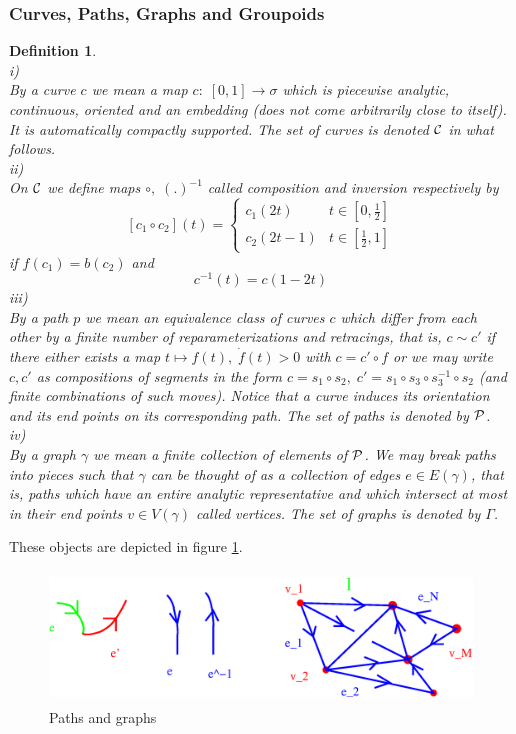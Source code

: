 \documentclass[12pt]{report}
\newtheorem{Definition}{Definition}[section]
\def\be{\begin{equation}}
\def\ee{\end{equation}}
\begin{document}
\subsubsection{Curves, Paths, Graphs and Groupoids}
\label{s.2.1.2.1}

%
\begin{Definition} \label{def2.1.2.1} ~~~~~\\
i)\\
By a curve $c$ we mean a map $c:\;[0,1]\to \sigma$ which is piecewise 
analytic, continuous,
oriented and an embedding (does not come arbitrarily close to itself).
It is automatically compactly supported.
The set of curves is denoted $\cal C$ in what follows.\\
ii)\\
On $\cal C$ we define maps $\circ,\;(.)^{-1}$ called composition and 
inversion respectively by 
\be \label{2.1.2.1}
[c_1\circ c_2](t)= \left\{ \begin{array}{cc}
c_1(2t) &  t\in [0,\frac{1}{2}] \\
c_2(2t-1) &  t\in [\frac{1}{2},1] 
\end{array} \right.
\ee
if $f(c_1)=b(c_2)$ and 
\be \label{2.1.2.2}
c^{-1}(t)=c(1-2t)
\ee
iii)\\
By a path $p$ we mean an equivalence class of curves $c$ which differ
from each other by a finite number of reparameterizations and retracings, 
that is, $c\sim c'$ if there either exists a map   
$t\mapsto f(t),\;\dot{f}(t)>0$ with $c=c'\circ f$ or we may write 
$c,c'$ as compositions of segments in the form $c=s_1\circ s_2,\; 
c'=s_1\circ s_3\circ s_3^{-1}\circ s_2$ (and finite combinations of 
such moves). Notice that a curve induces its orientation and its end 
points on its 
corresponding path. The set of paths is denoted by $\cal P$. \\
iv)\\
By a graph $\gamma$ we mean a finite collection of elements of $\cal P$.
We may break paths into pieces such that $\gamma$ can be thought of
as a collection of edges $e\in E(\gamma)$, that is, paths which have an 
entire analytic
representative and which intersect at most in their end points $v\in 
V(\gamma)$ called vertices. The set
of graphs is denoted by $\Gamma$.
\end{Definition}
%
These objects are depicted in figure \ref{f8}.
%
\begin{figure} 
\includegraphics[width=14cm,height=3.5cm]{proc9fig8.ps}
\caption{Paths and graphs}
\label{f8}
\end{figure}
\end{document}
